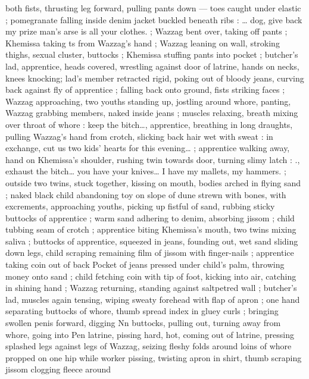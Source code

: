 both fists, thrusting leg forward, pulling pants down --- toes caught 
under elastic ; pomegranate falling inside denim jacket buckled 
beneath ribs : {\gl}{\ldots} dog, give back my prize{\td} man's arse is all your 
clothes.{\gr} ; Wazzag bent over, taking off pants ; Khemissa taking 
ts from Wazzag's hand ; Wazzag leaning on wall, stroking thighs, 
sexual cluster, buttocks ; Khemissa stuffing pants into pocket ; 
butcher's lad, apprentice, heads covered, wrestling against door of 
latrine, hands on necks, knees knocking; lad's member retracted 
rigid, poking out of bloody jeans, curving back against fly of 
apprentice ; falling back onto ground, fists striking faces ; Wazzag 
approaching, two youths standing up, jostling around whore, panting, 
Wazzag grabbing members, naked inside jeans ; muscles relaxing, 
breath mixing over throat of whore : {\gl} keep the bitch{\ldots}{\gr}, apprentice, 
breathing in long draughts, pulling Wazzag's hand from crotch, 
slicking back hair wet with sweat : {\gl}{\td} in exchange, cut us two kids' 
hearts for this evening{\ldots}{\gr} ; apprentice walking away, hand on 
Khemissa's shoulder, rushing twin towards door, turning slimy latch : 
{\gl}., exhaust the bitch{\ldots} you have your knives{\ldots} I have my mallets, my 
hammers.{\gr} ; outside {\td} two twins, stuck together, kissing on mouth, 
bodies arched in flying sand ; naked black child abandoning toy on 
slope of dune strewn with bones, with excrements, approaching 
youths, picking up fistful of sand, rubbing sticky buttocks of 
apprentice ; warm sand adhering to denim, absorbing jissom ; child 
tubbing seam of crotch ; apprentice biting Khemissa's mouth, two 
twins mixing saliva ; buttocks of apprentice, squeezed in jeans, 
founding out, wet sand sliding down legs, child scraping remaining 
film of jissom with finger-nails ; apprentice taking coin out of back 
Pocket of jeans pressed under child's palm, throwing money onto 
sand ; child fetching coin with tip of foot, kicking into air, catching in 
shining hand ; Wazzag returning, standing against saltpetred wall ; 
butcher's lad, muscles again tensing, wiping sweaty forehead with 
flap of apron ; one hand separating buttocks of whore, thumb spread 
index in gluey curls ; bringing swollen penis forward, digging 
Nn buttocks, pulling out, turning away from whore, going into 
Pen latrine, pissing hard, hot, coming out of latrine, pressing 
splashed legs against legs of Wazzag, seizing fleshy folds around 
loins of whore propped on one hip while worker pissing, twisting 
apron in shirt, thumb scraping jissom clogging fleece around 
